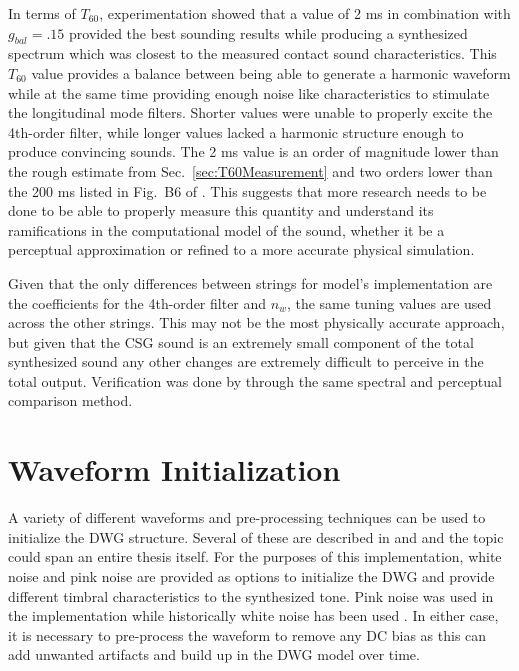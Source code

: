 \documentclass[../main.tex]{subfiles}
\begin{document}
In terms of $T_{60}$, experimentation showed that a value of 2 ms in combination with $g_{bal} = .15$ provided the best sounding results while producing a synthesized spectrum which was closest to the measured contact sound characteristics. This $T_{60}$ value provides a balance between being able to generate a harmonic waveform while at the same time providing enough noise like characteristics to stimulate the longitudinal mode filters. Shorter values were unable to properly excite the 4th-order filter, while longer values lacked a harmonic structure enough to produce convincing sounds. The 2 ms value is an order of magnitude lower than the rough estimate from Sec.~\ref{sec:T60Measurement} and two orders lower than the 200 ms listed in Fig.~B6 of . This suggests that more research needs to be done to be able to properly measure this quantity and understand its ramifications in the computational model of the sound, whether it be a perceptual approximation or refined to a more accurate physical simulation. 

Given that the only differences between strings for model's implementation are the coefficients for the 4th-order filter and $n_w$, the same tuning values are used across the other strings. This may not be the most physically accurate approach, but given that the CSG sound is an extremely small component of the total synthesized sound any other changes are extremely difficult to perceive in the total output. Verification was done by through the same spectral and perceptual comparison method.

\section{Waveform Initialization}
A variety of different waveforms and pre-processing techniques can be used to initialize the DWG structure. Several of these are described in  and  and the topic could span an entire thesis itself. For the purposes of this implementation, white noise and pink noise are provided as options to initialize the DWG and provide different timbral characteristics to the synthesized tone. Pink noise was used in the  implementation while historically white noise has been used . In either case, it is necessary to pre-process the waveform to remove any DC bias as this can add unwanted artifacts and build up in the DWG model over time.
\end{document}
